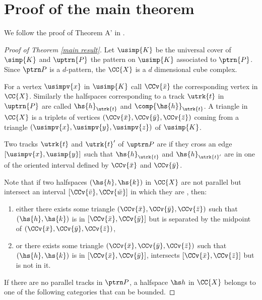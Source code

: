 \section{Proof of the main theorem}
We follow the proof of Theorem A' in \cite{BeLa16}.

\begin{proof}[Proof of Theorem \ref{main result}]
Let $\usimp{K}$ be the universal cover of $\simp{K}$ and $\uptrn{P}$ the pattern on $\usimp{K}$ associated to $\ptrn{P}$. Since $\ptrn P$ is a $d$-pattern, the \CCC $\CC{X}$ is a $d$ dimensional cube complex.

For a vertex $\usimpv{x}$ in $\usimp{K}$ call $\CCv{\bar{x}}$ the corresponding vertex in $\CC{X}$. Similarly the halfspaces corresponding to a track $\utrk{t}$ in $\uptrn{P}$ are called $\hs{h}_{\utrk{t}}$ and $\comp{\hs{h}}_{\utrk{t}}$. A triangle in $\CC{X}$ is a triplets of vertices $(\CCv{\bar{x}}, \CCv{\bar{y}}, \CCv{\bar{z}})$  coming from a triangle $(\usimpv{x},\usimpv{y},\usimpv{z})$ of $\usimp{K}$.

Two tracks $\utrk{t}$ and $\utrk{t}'$ of $\uptrn P$ are \emph{\adjP}  if they cross an edge $[\usimpv{x},\usimp{y}]$ such that $\hs{h}_{\utrk{t}}$ and $\hs{h}_{\utrk{t}'}$ are \adjP in one of the oriented interval defined by $\CCv{\bar{x}}$ and $\CCv{\bar{y}}$.

Note that if two halfspaces $(\hs{h}, \hs{k})$ in $\CC{X}$ are not parallel but intersect an interval $[\CCv{\bar{v}}, \CCv{\bar{w}}]$ in which they are \adjP, then:
\begin{enumerate}
\item  either there exists some triangle $(\CCv{\bar{x}}, \CCv{\bar{y}}, \CCv{\bar{z}})$ such that $(\hs{h}, \hs{k})$ is \adjP in  $[\CCv{\bar{x}}, \CCv{\bar{y}}]$ but is separated by the midpoint of $(\CCv{\bar{x}}, \CCv{\bar{y}}, \CCv{\bar{z}})$,
\item or  there exists some triangle $(\CCv{\bar{x}}, \CCv{\bar{y}}, \CCv{\bar{z}})$ such that $(\hs{h}, \hs{k})$ is \adjP in  $[\CCv{\bar{x}}, \CCv{\bar{y}}]$, intersects $[\CCv{\bar{x}}, \CCv{\bar{z}}]$ but is not \adjP in it.
\end{enumerate}

If there are no parallel tracks in $\ptrn P$, a halfspace $\hs h$ in $\CC{X}$  belongs to one of the following categories that can be bounded.


\end{proof}
